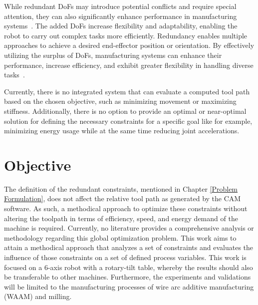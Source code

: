 \newpage
While redundant \acrshort{DoF}s may introduce potential conflicts and require special attention, they can also significantly enhance performance in manufacturing systems~\cite{Ayten.2016}. The added \acrshort{DoF}s increase flexibility and adaptability, enabling the robot to carry out complex tasks more efficiently. Redundancy enables multiple approaches to achieve a desired end-effector position or orientation. By effectively utilizing the surplus of \acrshort{DoF}s, manufacturing systems can enhance their performance, increase efficiency, and exhibit greater flexibility in handling diverse tasks~\cite{Boscariol.2020}. 

Currently, there is no integrated system that can evaluate a computed tool path based on the chosen objective, such as minimizing movement or maximizing stiffness. %
Additionally, there is no option to provide an optimal or near-optimal solution for defining the necessary constraints for a specific goal like for example, minimizing energy usage while at the same time reducing joint accelerations.


\section{Objective}\label{OBJECTIVE}
The definition of the redundant constraints, mentioned in Chapter \ref{Problem Formulation}, does not affect the relative tool path as generated by the \acrshort{CAM} software. As such, a methodical approach to optimize these constraints without altering the toolpath in terms of efficiency, speed, and energy demand of the machine is required. Currently, no literature provides a comprehensive analysis or methodology regarding this global optimization problem.
This work aims to attain a methodical approach that analyzes a set of constraints and evaluates the influence of those constraints on a set of defined process variables. This work is focused on a 6-axis robot with a rotary-tilt table, whereby the results should also be transferable to other machines. Furthermore, the experiments and validations will be limited to the manufacturing processes of wire arc additive manufacturing (\acrshort{WAAM}) and milling. 


